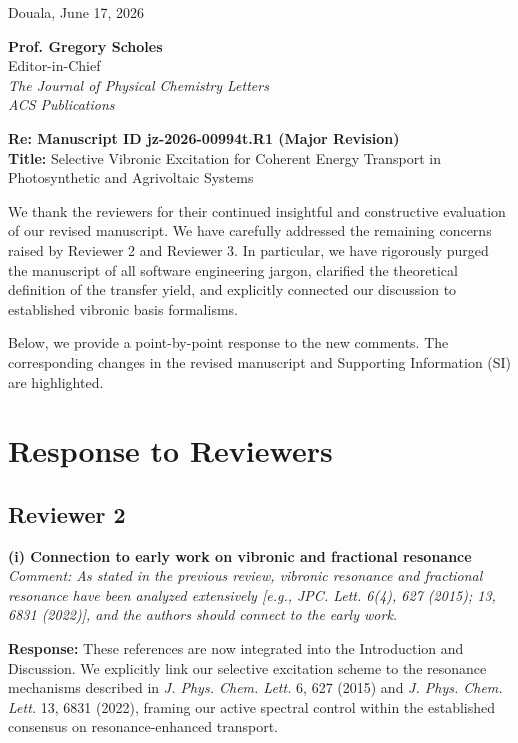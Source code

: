 \documentclass[11pt]{article}
\begin{document}
\begin{flushright}
    Douala, June 17, 2026
\end{flushright}

\noindent \textbf{Prof. Gregory Scholes}\\
Editor-in-Chief\\
\textit{The Journal of Physical Chemistry Letters}\\
\textit{ACS Publications}

\vspace{1em}

\noindent \textbf{Re: Manuscript ID jz-2026-00994t.R1 (Major Revision)}\\
\textbf{Title:} Selective Vibronic Excitation for Coherent Energy Transport in Photosynthetic and Agrivoltaic Systems

\vspace{2em}

\noindent We thank the reviewers for their continued insightful and constructive evaluation of our revised manuscript. We have carefully addressed the remaining concerns raised by Reviewer 2 and Reviewer 3. In particular, we have rigorously purged the manuscript of all software engineering jargon, clarified the theoretical definition of the transfer yield, and explicitly connected our discussion to established vibronic basis formalisms.

Below, we provide a point-by-point response to the new comments. The corresponding changes in the revised manuscript and Supporting Information (SI) are highlighted.

\vspace{2em}

\section*{Response to Reviewers}

\subsection*{Reviewer 2}

\textbf{(i) Connection to early work on vibronic and fractional resonance}
\textit{Comment: As stated in the previous review, vibronic resonance and fractional resonance have been analyzed extensively [e.g., JPC. Lett. 6(4), 627 (2015); 13, 6831 (2022)], and the authors should connect to the early work.}

\textbf{Response:} These references are now integrated into the Introduction and Discussion. We explicitly link our selective excitation scheme to the resonance mechanisms described in \textit{J. Phys. Chem. Lett.} 6, 627 (2015) and \textit{J. Phys. Chem. Lett.} 13, 6831 (2022), framing our active spectral control within the established consensus on resonance-enhanced transport.
\end{document}
